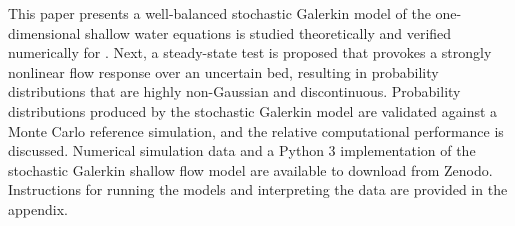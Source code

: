 This paper presents a well-balanced stochastic Galerkin model of the one-dimensional shallow water equations 
 is studied theoretically and verified numerically for .
Next, a steady-state test is proposed that provokes a strongly nonlinear flow response over an uncertain bed, resulting in probability distributions that are highly non-Gaussian and discontinuous.
Probability distributions produced by the stochastic Galerkin model are validated against a Monte Carlo reference simulation, and the relative computational performance is discussed.
Numerical simulation data \citep{shaw-kesserwani2019a} and a Python 3 implementation of the stochastic Galerkin shallow flow model \citep{shaw-kesserwani2019b} are available to download from Zenodo.
Instructions for running the models and interpreting the data are provided in the appendix.

